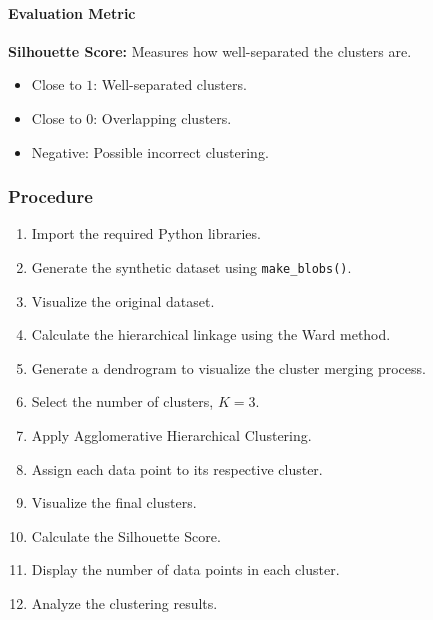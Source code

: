 \documentclass[a4paper,11pt]{article}
\begin{document}
\paragraph{Evaluation Metric}
\textbf{Silhouette Score:} Measures how well-separated the clusters are.
\begin{itemize}
    \item Close to $1$: Well-separated clusters.
    \item Close to $0$: Overlapping clusters.
    \item Negative: Possible incorrect clustering.
\end{itemize}

\subsubsection{Procedure}
\begin{enumerate}
    \item Import the required Python libraries.
    \item Generate the synthetic dataset using \texttt{make\_blobs()}.
    \item Visualize the original dataset.
    \item Calculate the hierarchical linkage using the Ward method.
    \item Generate a dendrogram to visualize the cluster merging process.
    \item Select the number of clusters, $K = 3$.
    \item Apply Agglomerative Hierarchical Clustering.
    \item Assign each data point to its respective cluster.
    \item Visualize the final clusters.
    \item Calculate the Silhouette Score.
    \item Display the number of data points in each cluster.
    \item Analyze the clustering results.
\end{enumerate}
\end{document}
